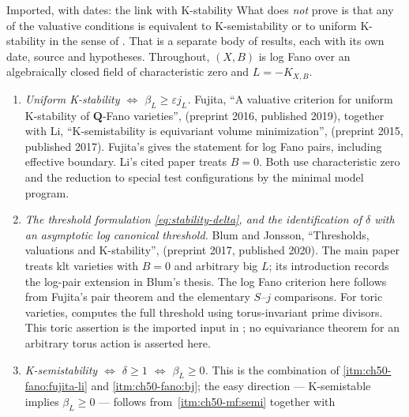 \begin{important}{Imported, with dates: the link with K-stability}
\label{imp:ch50-fano-imports}
What  does \emph{not} prove is that any
of the valuative conditions is equivalent to K-semistability or to uniform
K-stability in the sense of .  That is a
separate body of results, each with its own date, source and hypotheses.
Throughout, $(X,B)$ is log Fano over an algebraically closed field of
characteristic zero and $L=-K_{X,B}$.
\begin{enumerate}
\item\label{itm:ch50-fano:fujita-li}
      \emph{Uniform K-stability $\Leftrightarrow$
      $\beta_L\ge\varepsilon j_L$.}  Fujita, ``A valuative criterion for
      uniform K-stability of $\mathbf Q$-Fano varieties'',
      \cite{Fuj19} (preprint 2016, published 2019), together with
      Li, ``K-semistability is equivariant volume minimization'',
      \cite{Li17} (preprint 2015, published 2017).  Fujita's \cite[Theorem~6.5]{Fuj19} gives the statement for log Fano
      pairs, including effective boundary.  Li's cited paper treats
      $B=0$.  Both use characteristic zero and the reduction to
      special test configurations by the minimal model program.
\item\label{itm:ch50-fano:bj}
      \emph{The threshold formulation \eqref{eq:stability-delta}, and the
      identification of $\delta$ with an asymptotic log canonical
      threshold.}  Blum and Jonsson, ``Thresholds, valuations and
      K-stability'', \cite{BJ20} (preprint 2017, published 2020).  The main paper treats klt varieties with $B=0$ and arbitrary big
      $L$; its introduction records the log-pair extension in Blum's
      thesis.  The log Fano criterion here follows from Fujita's pair
      theorem and the elementary $S$--$j$ comparisons.  For toric
      varieties, \cite[Theorem~F]{BJ20} computes the full threshold using
      torus-invariant prime divisors.  This toric assertion is the
      imported input in ; no equivariance theorem
      for an arbitrary torus action is asserted here.
\item\label{itm:ch50-fano:semistable}
      \emph{K-semistability $\Leftrightarrow$ $\delta\ge1$
      $\Leftrightarrow$ $\beta_L\ge0$.}  This is the combination of
      \cref{itm:ch50-fano:fujita-li} and \cref{itm:ch50-fano:bj}; the easy
      direction --- K-semistable implies $\beta_L\ge0$ --- follows from
      \,\cref{itm:ch50-mf:semi} together with

\end{enumerate}
\end{important}
